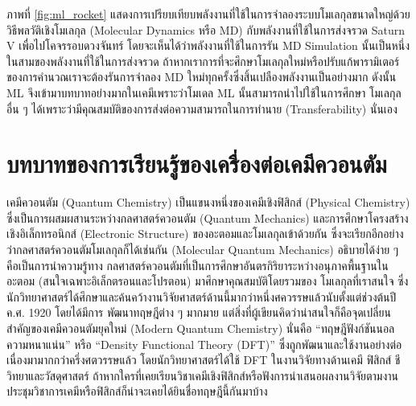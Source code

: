 ภาพที่ \ref{fig:ml_rocket} แสดงการเปรียบเทียบพลังงานที่ใช้ในการจำลองระบบโมเลกุลขนาดใหญ่ด้วยวิธีพลวัติเชิงโมเลกุล (Molecular 
Dynamics หรือ MD) กับพลังงานที่ใช้ในการส่งจรวด Saturn V เพื่อไปโคจรรอบดวงจันทร์ โดยจะเห็นได้ว่าพลังงานที่ใช้ในการรัน MD Simulation 
นั้นเป็นหนึ่งในสามของพลังงานที่ใช้ในการส่งจรวด ถ้าหากเราการที่จะศึกษาโมเลกุลใหม่หรือปรับแก้พารามิเตอร์ของการคำนวณเราจะต้องรันการจำลอง 
MD ใหม่ทุกครั้งซึ่งสิ้นเปลืองพลังงานเป็นอย่างมาก ดังนั้น ML จึงเข้ามาบทบาทอย่างมากในเคมีเพราะว่าโมเดล ML นั้นสามารถนำไปใช้ในการศึกษา%
โมเลกุลอื่น ๆ ได้เพราะว่ามีคุณสมบัติของการส่งต่อความสามารถในการทำนาย (Transferability) นั่นเอง

\section{บทบาทของการเรียนรู้ของเครื่องต่อเคมีควอนตัม}
\label{sec:ml_in_qm}

เคมีควอนตัม (Quantum Chemistry) เป็นแขนงหนึ่งของเคมีเชิงฟิสิกส์ (Physical Chemistry) ซึ่งเป็นการผสมผสานระหว่างกลศาสตร์ควอนตัม 
(Quantum Mechanics) และการศึกษาโครงสร้างเชิงอิเล็กทรอนิกส์ (Electronic Structure) ของอะตอมและโมเลกุลเข้าด้วยกัน 
ซึ่งจะเรียกอีกอย่างว่ากลศาสตร์ควอนตัมโมเลกุลก็ได้เช่นกัน (Molecular Quantum Mechanics) อธิบายได้ง่าย ๆ คือเป็นการนำความรู้ทาง%
กลศาสตร์ควอนตัมที่เป็นการศึกษาอันตรกิริยาระหว่างอนุภาคพื้นฐานในอะตอม (สนใจเฉพาะอิเล็กตรอนและโปรตอน) มาศึกษาคุณสมบัติโดยรวมของ%
โมเลกุลที่เราสนใจ ซึ่งนักวิทยาศาสตร์ได้ศึกษาและค้นคว้างานวิจัยศาสตร์ด้านนี้มากว่าหนึ่งศควรรษแล้วนับตั้งแต่ช่วงต้นปี ค.ศ. 1920 โดยได้มีการ%
พัฒนาทฤษฎีต่าง ๆ มากมาย แต่สิ่งที่ผู้เขียนคิดว่าน่าสนใจก็คือจุดเปลี่ยนสำคัญของเคมีควอนตัมยุคใหม่ (Modern Quantum Chemistry) นั่นคือ 
\enquote{ทฤษฎีฟังก์ชันนอลความหนาแน่น} หรือ \enquote{Density Functional Theory (DFT)}\autocite{kohn1996} 
ซึ่งถูกพัฒนาและใช้งานอย่างต่อเนื่องมามากกว่าครึ่งศตวรรษแล้ว โดยนักวิทยาศาสตร์ได้ใช้ DFT ในงานวิจัยทางด้านเคมี ฟิสิกส์ ชีวิทยาและวัสดุศาสตร์ 
ถ้าหากใครที่เคยเรียนวิชาเคมีเชิงฟิสิกส์หรือฟังการนำเสนอผลงานวิจัยตามงานประชุมวิชาการเคมีหรือฟิสิกส์ก็น่าจะเคยได้ยินชื่อทฤษฎีนี้กันมาบ้าง 

